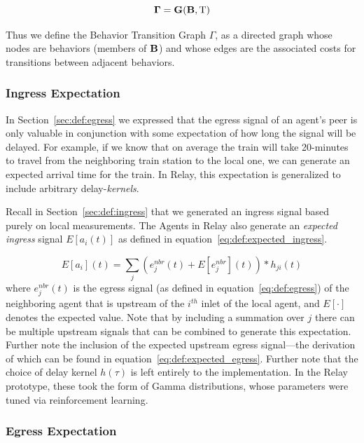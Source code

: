 \documentclass{report}
\newcommand{\Tau}{\mathrm{T}}
\begin{document}
\begin{equation}\label{eq:def:btg}
	\bf{\Gamma} = G(\bf{B}, \Tau)
\end{equation}

Thus we define the Behavior Transition Graph $\Gamma$, as a directed graph whose nodes are behaviors (members of $\bf{B}$) and whose edges are the associated costs for transitions between adjacent behaviors.


\subsubsection{Ingress Expectation}
\label{sec:def:expected_ingress}

In Section~\ref{sec:def:egress} we expressed that the egress signal of an agent's peer is only valuable in conjunction with some expectation of how long the signal will be delayed.
For example, if we know that on average the train will take 20-minutes to travel from the neighboring train station to the local one, we can  generate an expected arrival time for the train.
In Relay, this expectation is generalized to include arbitrary delay-\emph{kernels}.

Recall in Section~\ref{sec:def:ingress} that we generated an ingress signal based purely on local measurements.
The Agents in Relay also generate an \emph{expected ingress} signal $E\left[a_i(t)\right]$ as defined in equation~\eqref{eq:def:expected_ingress}.

\begin{equation}\label{eq:def:expected_ingress}
	E\left[a_i\right](t) = \sum_{j} \left(e_j^{nbr}(t) + E\left[e_j^{nbr}\right](t) \right) * h_{ji}(t)
\end{equation}
where $e_j^{nbr}(t)$ is the egress signal (as defined in equation~\eqref{eq:def:egress}) of the neighboring agent that is upstream of the $i^{th}$ inlet of the local agent, and $E\left[ \cdot \right]$ denotes the expected value.
Note that by including a summation over $j$ there can be multiple upstream signals that can be combined to generate this expectation.
Further note the inclusion of the expected upstream egress signal---the derivation of which can be found in equation~\eqref{eq:def:expected_egress}.
Further note that the choice of delay kernel $h(\tau)$ is left entirely to the implementation.
In the Relay prototype, these took the form of Gamma distributions, whose parameters were tuned via reinforcement learning.

\subsubsection{Egress Expectation}
\label{sec:def:expected_egress}
\end{document}
